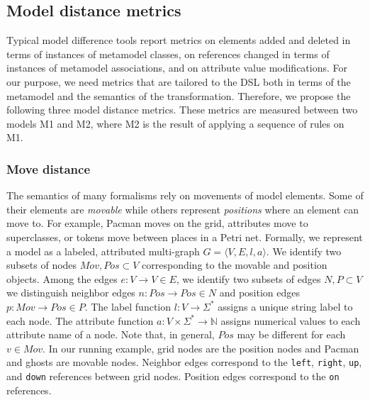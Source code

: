 \subsection{Model distance metrics}

Typical model difference tools report metrics on elements added and deleted in terms of instances of metamodel classes, on references changed in terms of instances of metamodel associations, and on attribute value modifications.
For our purpose, we need metrics that are tailored to the DSL both in terms of the metamodel and the semantics of the transformation.
Therefore, we propose the following three model distance metrics.
These metrics are measured between two models M1 and M2, where M2 is the result of applying a sequence of rules on M1.

\subsubsection{Move distance}
The semantics of many formalisms rely on movements of model elements.
Some of their elements are \emph{movable} while others represent \emph{positions} where an element can move to.
For example, Pacman moves on the grid, attributes move to superclasses, or tokens move between places in a Petri net.
%
Formally, we represent a model as a labeled, attributed multi-graph $G=\langle V,E,l,a \rangle$.
We identify two subsets of nodes $Mov,Pos \subset V$ corresponding to the movable and position objects.
Among the edges $e:V \rightarrow V \in E$, we identify two subsets of edges $N,P \subset V$
we distinguish neighbor edges $n: Pos \rightarrow Pos \in N$ and position edges $p: Mov \rightarrow Pos \in P$.
The label function $l:V \rightarrow \Sigma^*$ assigns a unique string label to each node.
The attribute function $a:V \times \Sigma^* \rightarrow \mathbb{N}$ assigns numerical values to each attribute name of a node.
Note that, in general, $Pos$ may be different for each $v \in Mov$.
In our running example, grid nodes are the position nodes and Pacman and ghosts are movable nodes.
Neighbor edges correspond to the \texttt{left}, \texttt{right}, \texttt{up}, and \texttt{down} references between grid nodes.
Position edges correspond to the \texttt{on} references.

